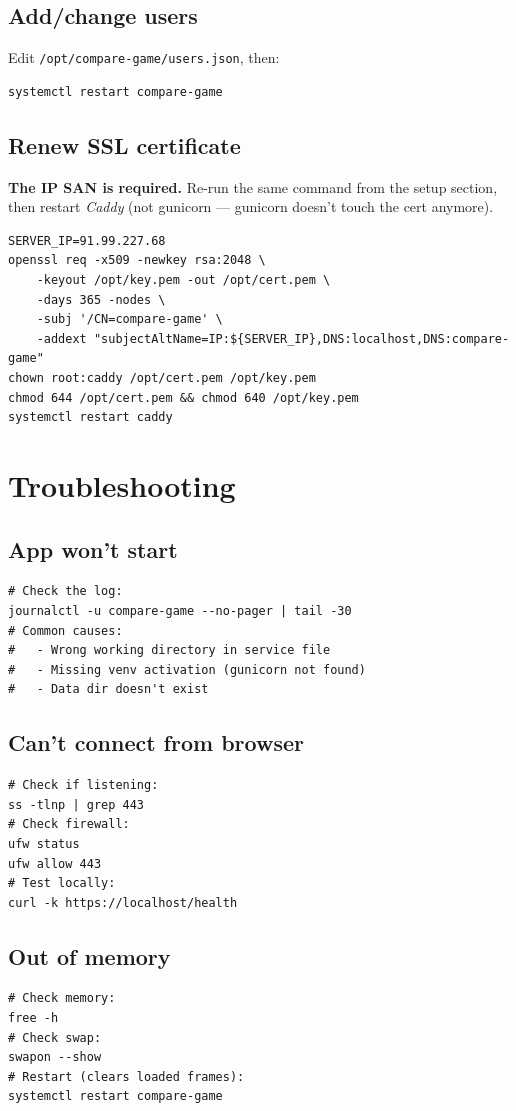 \documentclass[11pt]{article}
\begin{document}
\subsection{Add/change users}
Edit \texttt{/opt/compare-game/users.json}, then:
\begin{lstlisting}
systemctl restart compare-game
\end{lstlisting}

\subsection{Renew SSL certificate}
\textbf{The IP SAN is required.} Re-run the same command from the setup section, then restart \emph{Caddy} (not gunicorn — gunicorn doesn't touch the cert anymore).
\begin{lstlisting}
SERVER_IP=91.99.227.68
openssl req -x509 -newkey rsa:2048 \
    -keyout /opt/key.pem -out /opt/cert.pem \
    -days 365 -nodes \
    -subj '/CN=compare-game' \
    -addext "subjectAltName=IP:${SERVER_IP},DNS:localhost,DNS:compare-game"
chown root:caddy /opt/cert.pem /opt/key.pem
chmod 644 /opt/cert.pem && chmod 640 /opt/key.pem
systemctl restart caddy
\end{lstlisting}

\section{Troubleshooting}

\subsection{App won't start}
\begin{lstlisting}
# Check the log:
journalctl -u compare-game --no-pager | tail -30
# Common causes:
#   - Wrong working directory in service file
#   - Missing venv activation (gunicorn not found)
#   - Data dir doesn't exist
\end{lstlisting}

\subsection{Can't connect from browser}
\begin{lstlisting}
# Check if listening:
ss -tlnp | grep 443
# Check firewall:
ufw status
ufw allow 443
# Test locally:
curl -k https://localhost/health
\end{lstlisting}

\subsection{Out of memory}
\begin{lstlisting}
# Check memory:
free -h
# Check swap:
swapon --show
# Restart (clears loaded frames):
systemctl restart compare-game
\end{lstlisting}
\end{document}
